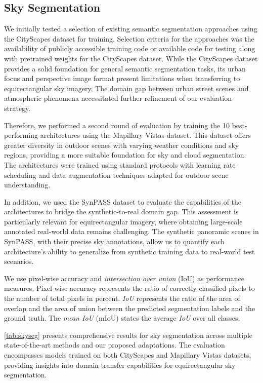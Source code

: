 \documentclass[conference]{IEEEtran}
\begin{document}
\subsection{Sky Segmentation}\label{subsec:skysegmentation}

We initially tested a selection of existing semantic segmentation approaches using the CityScapes dataset for training. Selection criteria for the approaches was the availability of publicly accessible training code or available code for testing along with pretrained weights for the CityScapes dataset. While the CityScapes dataset provides a solid foundation for general semantic segmentation tasks, its urban focus and perspective image format present limitations when transferring to equirectangular sky imagery. The domain gap between urban street scenes and atmospheric phenomena necessitated further refinement of our evaluation strategy.

Therefore, we performed a second round of evaluation by training the 10 best-performing architectures using the Mapillary Vistas dataset. This dataset offers greater diversity in outdoor scenes with varying weather conditions and sky regions, providing a more suitable foundation for sky and cloud segmentation. The architectures were trained using standard protocols with learning rate scheduling and data augmentation techniques adapted for outdoor scene understanding.

In addition, we used the SynPASS dataset to evaluate the capabilities of the architectures to bridge the synthetic-to-real domain gap.
This assessment is particularly relevant for equirectangular imagery, where obtaining large-scale annotated real-world data remains challenging.
The synthetic panoramic scenes in SynPASS, with their precise sky annotations, allow us to quantify each architecture's ability to generalize from synthetic training data to real-world test scenarios.

We use pixel-wise accuracy and \textit{intersection over union} (IoU) as performance measures.
Pixel-wise accuracy represents the ratio of correctly classified pixels to the number of total pixels in percent.
\textit{IoU} represents the ratio of the area of overlap and the area of union between the predicted segmentation labels and the ground truth.
The \textit{mean IoU} (mIoU) states the average \textit{IoU} over all classes.

\autoref{tab:skyseg} presents comprehensive results for sky segmentation across multiple state-of-the-art methods and our proposed adaptations. The evaluation encompasses models trained on both CityScapes and Mapillary Vistas datasets, providing insights into domain transfer capabilities for equirectangular sky segmentation.
\end{document}
